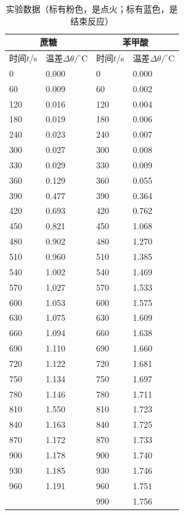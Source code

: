 \documentclass[UTF8,AutoFakeBold,a4paper]{article}
\begin{document}
\newpage
\begin{table}[h]
		\centering
		\begin{tabular}{p{3cm}<{\centering} p{3cm}<{\centering} p{3cm}<{\centering} p{3cm}<{\centering}}
		\toprule
		\multicolumn{2}{c}{蔗糖} &   \multicolumn{2}{c}{苯甲酸}   \\  
		\midrule
        时间$t$/s & 温差$\Delta\theta/^{\circ}$C & 时间$t$/s & 温差$\Delta\theta/^{\circ}$C \\  
        \midrule
        0 & 0.000 & 0 & 0.000 \\  
        60 & 0.009 & 60 & 0.002 \\  
        120 & 0.016 & 120 & 0.004 \\  
        180 & 0.019 & 180 & 0.006 \\  
        240 & 0.023 & 240 & 0.007 \\  
        300 & 0.027 & 300 & 0.008 \\  
        330 & 0.029 & 330 & 0.009 \\ 
        \rowcolor{mypink} 
        360 & 0.129 & 360 & 0.055 \\  
        390 & 0.477 & 390 & 0.364 \\  
        420 & 0.693 & 420 & 0.762 \\  
        450 & 0.821 & 450 & 1.068 \\  
        480 & 0.902 & 480 & 1.270 \\  
        510 & 0.960 & 510 & 1.385 \\  
        540 & 1.002 & 540 & 1.469 \\  
        570 & 1.027 & 570 & 1.533 \\  
        600 & 1.053 & 600 & 1.575 \\  
        630 & 1.075 & 630 & 1.609 \\  
        660 & 1.094 & 660 & 1.638 \\  
        690 & 1.110 & 690 & 1.660 \\  
        720 & 1.122 & 720 & 1.681 \\  
        750 & 1.134 & 750 & 1.697 \\  
        780 & 1.146 & 780 & 1.711 \\  
        810 & 1.550 & 810 & 1.723 \\
        \rowcolor{mycyan}  
        840 & 1.163 & 840 & 1.725 \\  
        870 & 1.172 & 870 & 1.733 \\  
        900 & 1.178 & 900 & 1.740 \\  
        930 & 1.185 & 930 & 1.746 \\  
        960 & 1.191 & 960 & 1.751 \\  
         & &990 & 1.756   \\  
		\bottomrule
		\end{tabular}	
		\label{ta1}
		\caption{实验数据（标有\textcolor{mypink}{粉色}，是点火；标有\textcolor{mycyan}{蓝色}，是结束反应）}
\end{table}
\end{document}
